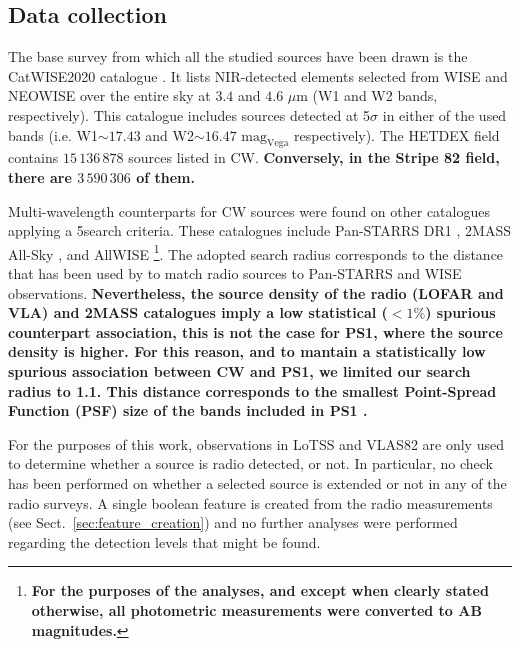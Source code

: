 \documentclass{aa}
\begin{document}
\subsection{Data collection}\label{sec:data_collection}

The base survey from which all the studied sources have been drawn is the CatWISE2020 catalogue \citep[CW;][]{2021ApJS..253....8M}. It lists NIR-detected elements selected from WISE \citep{2010AJ....140.1868W} and NEOWISE \citep{2011ApJ...731...53M, 2014ApJ...792...30M} over the entire sky at $3.4$ and $4.6$ $\mu$m (W1 and W2 bands, respectively). This catalogue includes sources detected at 5$\sigma$ in either of the used bands (i.e. W1${\sim} 17.43$ and W2${\sim} 16.47$ $\mathrm{mag}_{\mathrm{Vega}}$ respectively). The HETDEX field contains $15\,136\,878$ sources listed in CW. \textbf{Conversely, in the Stripe 82 field, there are $3\,590\,306$ of them.}

Multi-wavelength counterparts for CW sources were found on other catalogues applying a 5\arcsec search criteria. These catalogues include Pan-STARRS DR1 \citep[PS1;][]{2016arXiv161205560C, 2020ApJS..251....7F}, 2MASS All-Sky \citep[2M;][]{2006AJ....131.1163S, 2003tmc..book.....C, 2003yCat.2246....0C}, and AllWISE \citep[AW;][]{2013wise.rept....1C}\footnote{\textbf{For the purposes of the analyses, and except when clearly stated otherwise, all photometric measurements were converted to AB magnitudes.}}. The adopted search radius corresponds to the distance that has been used by \citet{2010AJ....140.1868W} to match radio sources to Pan-STARRS and WISE observations.   \textbf{Nevertheless, the source density of the radio (LOFAR and VLA) and 2MASS catalogues imply a low statistical ($<1\%$) spurious counterpart association, this is not the case for PS1, where the source density is higher. For this reason, and to mantain a statistically low spurious association between CW and PS1, we limited our search radius to 1.1\arcsec. This distance corresponds to the smallest Point-Spread Function (PSF) size of the bands included in PS1 \citep{2016arXiv161205560C}.}

For the purposes of this work, observations in LoTSS and VLAS82 are only used to determine whether a source is radio detected, or not. In particular, no check has been performed on whether a selected source is extended or not in any of the radio surveys. A single boolean feature is created from the radio measurements (see Sect.~\ref{sec:feature_creation}) and no further analyses were performed regarding the detection levels that might be found.
\end{document}
